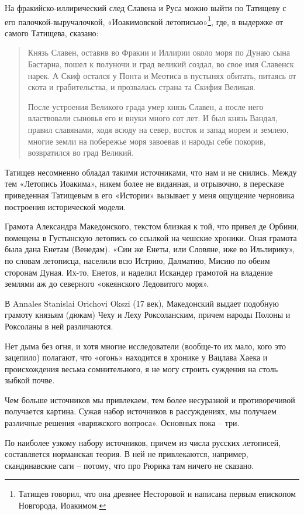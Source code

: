 На фракийско-иллирический след Славена и Руса можно выйти по Татищеву с его палочкой-выручалочкой, «Иоакимовской летописью»\footnote{Татищев говорил, что она древнее Несторовой и написана первым епископом Новгорода, Иоакимом.}, где, в выдержке от самого Татищева, сказано:

\begin{quotation}
Князь Славен, оставив во Фракии и Иллирии около моря по Дунаю сына Бастарна, пошел к полуночи и град великий создал, во свое имя Славенск нарек. А Скиф остался у Понта и Меотиса в пустынях обитать, питаясь от скота и грабительства, и прозвалась страна та Скифия Великая.

После устроения Великого града умер князь Славен, а после него властвовали сыновья его и внуки много сот лет. И был князь Вандал, правил славянами, ходя всюду на север, восток и запад морем и землею, многие земли на побережье моря завоевав и народы себе покорив, возвратился во град Великий.
\end{quotation}

Татищев несомненно обладал такими источниками, что нам и не снились. Между тем «Летопись Иоакима», никем более не виданная, и отрывочно, в пересказе приведенная Татищевым в его «Истории» вызывает у меня ощущение черновика построения исторической модели. 

Грамота Александра Македонского, текстом близкая к той, что привел де Орбини, помещена в Густынскую летопись со ссылкой на чешские хроники. Оная грамота была дана Енетам (Венедам). «Сии же Енеты, или Словяне, иже во Ильлирику», по словам летописца, населили всю Истрию, Далматию, Мисию по обеим сторонам Дуная. Их-то, Енетов, и наделил Искандер грамотой на владение землями аж до северного «океянского Ледовитого моря». 

В Annales Stanislai Orichovi Okszi (17 век), Македонский выдает подобную грамоту князьям (дюкам) Чеху и Леху Роксоланским, причем народы Полоны и Роксоланы в ней различаются.

Нет дыма без огня, и хотя многие исследователи (вообще-то их мало, кого это зацепило) полагают, что «огонь» находится в хронике у Вацлава Хаека и происхождения весьма сомнительного, я не могу строить суждения на столь зыбкой почве.

Чем больше источников мы привлекаем, тем более несуразной и противоречивой получается картина. Суж\-ая набор источников в рассуждениях, мы получаем различные решения «варяжского вопроса». Основных пока – три.

По наиболее узкому набору источников, причем из числа русских летописей, составляется норманская теория. В ней не привлекаются, например, скандинавские саги – потому, что про Рюрика там ничего не сказано. 

